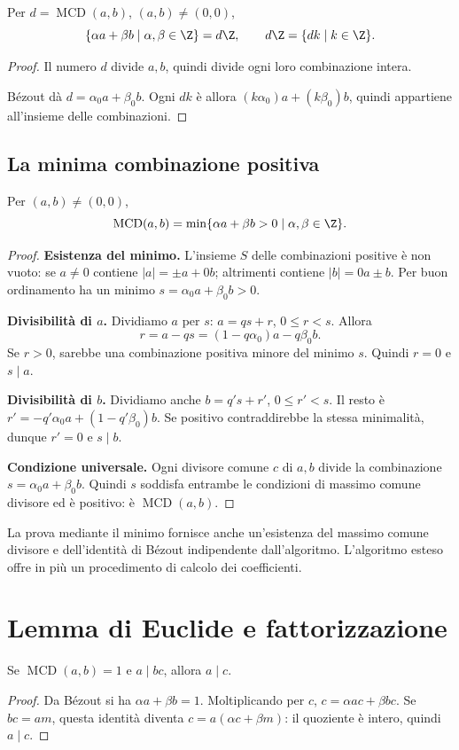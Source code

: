 \begin{corollario}
Per $d=\operatorname{MCD}(a,b)$, $(a,b)\ne(0,0)$,
\[
\{\alpha a+\beta b\mid\alpha,\beta\in\Z\}=d\Z,
\qquad d\Z=\{dk\mid k\in\Z\}.
\]
\end{corollario}
\begin{proof}
\passomath{\subseteq} Il numero $d$ divide $a,b$, quindi divide ogni loro combinazione intera.

\passomath{\supseteq} Bézout dà $d=\alpha_0a+\beta_0b$. Ogni $dk$ è allora $(k\alpha_0)a+(k\beta_0)b$, quindi appartiene all'insieme delle combinazioni.
\end{proof}

\subsection{La minima combinazione positiva}
\begin{proposizione}\label{prop:min-combinazione}
Per $(a,b)\ne(0,0)$,
\[
\operatorname{MCD}(a,b)=\min\{\alpha a+\beta b>0\mid\alpha,\beta\in\Z\}.
\]
\end{proposizione}
\begin{proof}
\textbf{Esistenza del minimo.} L'insieme $S$ delle combinazioni positive è non vuoto: se $a\ne0$ contiene $|a|=\pm a+0b$; altrimenti contiene $|b|=0a\pm b$. Per buon ordinamento ha un minimo $s=\alpha_0a+\beta_0b>0$.

\textbf{Divisibilità di $a$.} Dividiamo $a$ per $s$: $a=qs+r$, $0\le r<s$. Allora
\[
r=a-qs=(1-q\alpha_0)a-q\beta_0b.
\]
Se $r>0$, sarebbe una combinazione positiva minore del minimo $s$. Quindi $r=0$ e $s\mid a$.

\textbf{Divisibilità di $b$.} Dividiamo anche $b=q's+r'$, $0\le r'<s$. Il resto è $r'=-q'\alpha_0a+(1-q'\beta_0)b$. Se positivo contraddirebbe la stessa minimalità, dunque $r'=0$ e $s\mid b$.

\textbf{Condizione universale.} Ogni divisore comune $c$ di $a,b$ divide la combinazione $s=\alpha_0a+\beta_0b$. Quindi $s$ soddisfa entrambe le condizioni di massimo comune divisore ed è positivo: è $\operatorname{MCD}(a,b)$.
\end{proof}

La prova mediante il minimo fornisce anche un'esistenza del massimo comune divisore e dell'identità di Bézout indipendente dall'algoritmo. L'algoritmo esteso offre in più un procedimento di calcolo dei coefficienti.

\section{Lemma di Euclide e fattorizzazione}
\begin{lemma}[Euclide]\label{lem:euclide}
Se $\operatorname{MCD}(a,b)=1$ e $a\mid bc$, allora $a\mid c$.
\end{lemma}
\begin{proof}
Da Bézout si ha $\alpha a+\beta b=1$. Moltiplicando per $c$, $c=\alpha ac+\beta bc$. Se $bc=am$, questa identità diventa $c=a(\alpha c+\beta m)$: il quoziente è intero, quindi $a\mid c$.
\end{proof}

